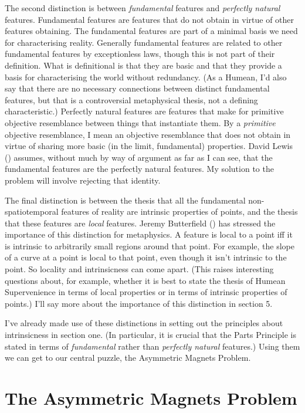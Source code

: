 \documentclass[
  11pt,
  letterpaper,
  DIV=11,
  numbers=noendperiod,
  twoside]{scrartcl}
\begin{document}
The second distinction is between \emph{fundamental} features and
\emph{perfectly natural} features. Fundamental features are features
that do not obtain in virtue of other features obtaining. The
fundamental features are part of a minimal basis we need for
characterising reality. Generally fundamental features are related to
other fundamental features by exceptionless laws, though this is not
part of their definition. What is definitional is that they are basic
and that they provide a basis for characterising the world without
redundancy. (As a Humean, I'd also say that there are no necessary
connections between distinct fundamental features, but that is a
controversial metaphysical thesis, not a defining characteristic.)
Perfectly natural features are features that make for primitive
objective resemblance between things that instantiate them. By a
\emph{primitive} objective resemblance, I mean an objective resemblance
that does not obtain in virtue of sharing more basic (in the limit,
fundamental) properties. David Lewis ()
assumes, without much by way of argument as far as I can see, that the
fundamental features are the perfectly natural features. My solution to
the problem will involve rejecting that identity.

The final distinction is between the thesis that all the fundamental
non-spatiotemporal features of reality are intrinsic properties of
points, and the thesis that these features are \emph{local} features.
Jeremy Butterfield () has stressed
the importance of this distinction for metaphysics. A feature is local
to a point iff it is intrinsic to arbitrarily small regions around that
point. For example, the slope of a curve at a point is local to that
point, even though it isn't intrinsic to the point. So locality and
intrinsicness can come apart. (This raises interesting questions about,
for example, whether it is best to state the thesis of Humean
Supervenience in terms of local properties or in terms of intrinsic
properties of points.) I'll say more about the importance of this
distinction in section 5.

I've already made use of these distinctions in setting out the
principles about intrinsicness in section one. (In particular, it is
crucial that the Parts Principle is stated in terms of
\emph{fundamental} rather than \emph{perfectly natural} features.) Using
them we can get to our central puzzle, the Asymmetric Magnets Problem.

\section{The Asymmetric Magnets
Problem}\label{the-asymmetric-magnets-problem}
\end{document}
